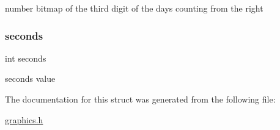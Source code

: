 number bitmap of the third digit of the days counting from the right 

\mbox{\label{struct_countdown_a77bd4f876bdc3afed5acdd936f775d34}} 
\subsubsection{\texorpdfstring{seconds}{seconds}}
{\footnotesize\ttfamily int seconds}



seconds value 



The documentation for this struct was generated from the following file\+:\begin{DoxyCompactItemize}
\item 
\hyperlink{graphics_8h}{graphics.\+h}\end{DoxyCompactItemize}
